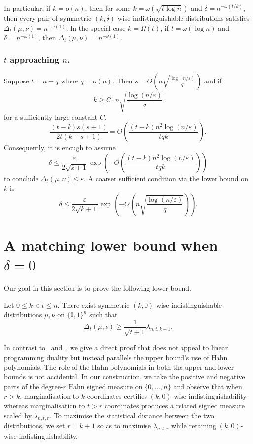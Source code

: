 \documentclass[manuscript,nonacm]{acmart}
\begin{document}
In particular, if $k=o(n)$, then for some $k=\omega\!\left(\sqrt{t\log n}\right)$ and $\delta=n^{-\omega(t/k)}$, then every pair of symmetric \((k,\delta)\)-wise indistinguishable distributions satisfies $\Delta_t(\mu,\nu)=n^{-\omega(1)}$. 
In the special case \(k=\Omega(t)\), if $t=\omega(\log n)$ and $\delta=n^{-\omega(1)}$, then $\Delta_t(\mu,\nu)=n^{-\omega(1)}$.

\subsubsection{$t$ approaching $n$.}
Suppose \(t=n-q\) where $q=o(n)$. Then $s=O\!\left(n\sqrt{\frac{\log(n/\varepsilon)}{q}}\right)$ and if
\[
    k
    \ge
    C \cdot n\sqrt{\frac{\log(n/\varepsilon)}{q}}
\]
for a sufficiently large constant \(C\),
\[
    \frac{(t-k)s(s+1)}
         {2t(k-s+1)}
    =
    O\!\left(
        \frac{(t-k)n^2\log(n/\varepsilon)}
             {tqk}
    \right).
\]
Consequently, it is enough to assume
\[
    \delta
    \le
    \frac{\varepsilon}{2\sqrt{k+1}}
    \exp\!\left(
        -O\!\left(
            \frac{(t-k)n^2\log(n/\varepsilon)}
                 {tqk}
        \right)
    \right)
\]
to conclude $\Delta_t(\mu,\nu)\le \varepsilon$.
A coarser sufficient condition via the lower bound on $k$ is
\[
    \delta
    \le
    \frac{\varepsilon}{2\sqrt{k+1}}
    \exp\!\left(
        -O\!\left(
            n\sqrt{\frac{\log(n/\varepsilon)}{q}}
        \right)
    \right).
\]

\section{A matching lower bound when $\delta=0$}
\label{s:mainLBsection}
Our goal in this section is to prove the following lower bound.
\begin{theorem}
\label{thm:exact-case-tightness}
Let \(0\le k<t\le n\). There exist symmetric \((k,0)\)-wise indistinguishable distributions
\(\mu,\nu\) on \(\{0,1\}^n\) such that
\[
    \Delta_t(\mu,\nu)
    \ge
    \frac{1}{\sqrt{t+1}}
    \lambda_{n,t,k+1}.
\]
\end{theorem}
In contrast to~\cite{bogdanov2019approximate} and~\cite{williamson2021sharp}, we give a direct proof that does not appeal to linear programming duality but instead parallels the upper bound's use of Hahn polynomials. The role of the Hahn polynomials in both the upper and lower bounds is
not accidental. In our construction, we take the positive and negative parts of the degree-\(r\) Hahn signed measure on \(\{0,\dots,n\}\) and observe that when $r>k$, marginalisation to \(k\) coordinates certifies $(k,0)$-wise indistinguishability whereas
marginalisation to \(t>r\) coordinates produces a related signed measure scaled by \(\lambda_{n,t,r}\). To maximise the statistical distance between the two distributions, we set $r=k+1$ so as to maximise \(\lambda_{n,t,r}\) while retaining $(k,0)$-wise indistinguishability.
\end{document}
